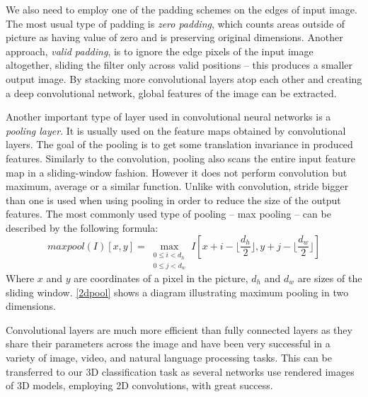 We also need to employ one of the padding schemes on the edges of input image. The most usual type of padding is \textit{zero padding}, which counts areas outside of picture as having value of zero and is preserving original dimensions. Another approach, \textit{valid padding}, is to ignore the edge pixels of the input image altogether, sliding the filter only across valid positions -- this produces a smaller output image.
By stacking more convolutional layers atop each other and creating a deep convolutional network,  global features of the image can be extracted. 
\par
Another important type of layer used in convolutional neural networks is a \textit{pooling layer}. It is usually used on the feature maps obtained by convolutional layers. The goal of the pooling is to get some translation invariance in produced features. Similarly to the convolution, pooling also scans the entire input feature map in a sliding-window fashion. However it does not perform convolution but maximum, average or a similar function. Unlike with convolution, stride bigger than one is used when using pooling in order to reduce the size of the output features.
The most commonly used type of pooling -- max pooling -- can be described by the following formula: 
$$maxpool(I)[x,y] =
\max_{\substack{0 \leq i < d_h\\
		0 \leq j < d_w}}
I[x + i - \lfloor \frac{d_h}{2} \rfloor, y + j - \lfloor \frac{d_w}{2}  \rfloor ] $$ Where $x$ and $y$ are coordinates of a pixel in the picture, $d_h$ and $d_w$ are sizes of the sliding window. \autoref{2dpool} shows a diagram illustrating maximum pooling in two dimensions.\par
Convolutional layers are much more efficient than fully connected layers as they share their parameters across the image and have been very successful in a variety of image, video, and natural language processing tasks. This  can be transferred to our 3D classification task as several networks use rendered images of 3D models, employing 2D convolutions, with great success. 



